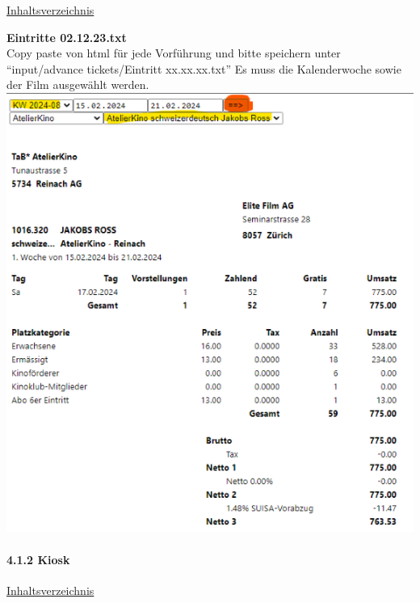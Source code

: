 \documentclass[
]{article}
\begin{document}
\hyperref[Inhaltsverzeichnis]{Inhaltsverzeichnis}

\textbf{Eintritte 02.12.23.txt}\\
Copy paste von html für jede Vorführung und bitte speichern unter
``input/advance tickets/Eintritt xx.xx.xx.txt'' Es muss die
Kalenderwoche sowie der Film ausgewählt werden.\\
\includegraphics{doc/eintritt.png}

\paragraph{4.1.2 Kiosk}\label{kiosk}

\hyperref[Inhaltsverzeichnis]{Inhaltsverzeichnis}
\end{document}
